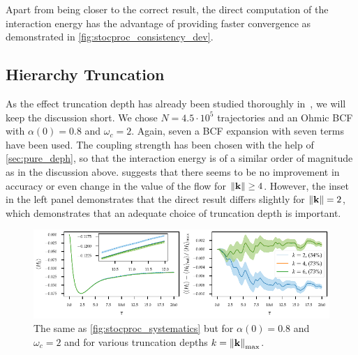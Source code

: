 Apart from being closer to the correct result, the direct computation
of the interaction energy has the advantage of providing faster
convergence as demonstrated in \cref{fig:stocproc_consistency_dev}.

\subsection{Hierarchy Truncation}
\label{sec:trunc}
As the effect truncation depth has already been studied thoroughly
in~\cite{RichardDiss}, we will keep the discussion short.  We chose
\(N=4.5 \cdot 10^5\) trajectories and an Ohmic BCF with \(α(0)=0.8\)
and \(ω_c=2\). Again, seven a BCF expansion with seven terms have been
used. The coupling strength has been chosen with the help of
\cref{sec:pure_deph}, so that the interaction energy is of a similar
order of magnitude as in the discussion
above.  suggests that there seems to be no
improvement in accuracy or even change in the value of the flow for
\(\norm{\vb{k}}\geq 4\). However, the inset in the left panel
demonstrates that the direct result differs slightly for
\(\norm{\vb{k}} = 2\), which demonstrates that an adequate choice of
truncation depth is important.
\begin{figure}[htp]
  \centering
  \includegraphics{figs/one_bath_syst/k_systematics_interaction}
  \caption{\label{fig:k_systematics} The same as
    \cref{fig:stocproc_systematics} but for \(α(0)=0.8\) and
    \(ω_c=2\) and for various truncation depths \(k=\norm{\vb{k}}_{\mathrm{max}}\).}
\end{figure}


